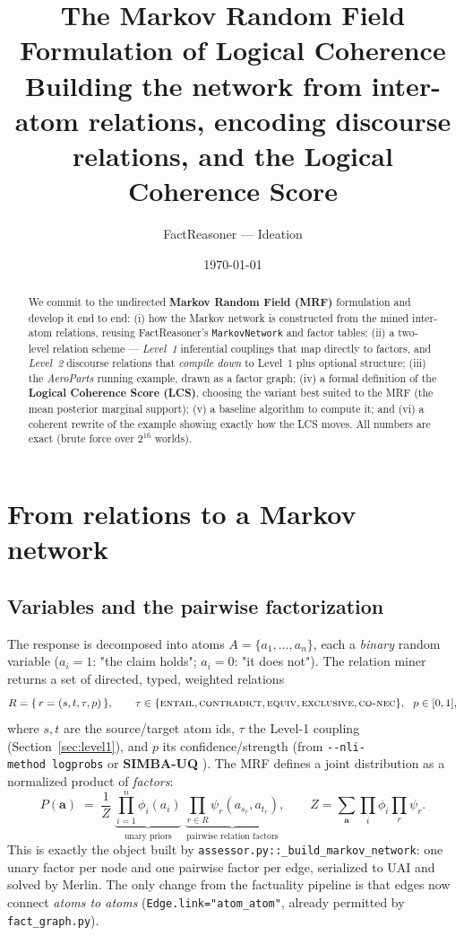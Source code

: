 \documentclass[11pt]{article}
\title{The Markov Random Field Formulation of Logical Coherence\\
       \large Building the network from inter-atom relations, encoding discourse
       relations, and the Logical Coherence Score}
\author{FactReasoner --- Ideation}
\date{\today}
\begin{document}
\maketitle

\begin{abstract}\noindent
We commit to the undirected \textbf{Markov Random Field (MRF)} formulation and develop it
end to end: (i) how the Markov network is constructed from the mined inter-atom relations,
reusing FactReasoner's \texttt{MarkovNetwork} and factor tables; (ii) a two-level relation
scheme --- \emph{Level~1} inferential couplings that map directly to factors, and
\emph{Level~2} discourse relations that \emph{compile down} to Level~1 plus optional
structure; (iii) the \emph{AeroParts} running example, drawn as a factor graph;
(iv) a formal definition of the \textbf{Logical Coherence Score (LCS)}, choosing the
variant best suited to the MRF (the mean posterior marginal support); (v) a baseline
algorithm to compute it; and (vi) a coherent rewrite of the example showing exactly how the
LCS moves. All numbers are exact (brute force over $2^{16}$ worlds).
\end{abstract}

\tableofcontents

\section{From relations to a Markov network}
\label{sec:build}

\subsection{Variables and the pairwise factorization}
The response is decomposed into atoms $A=\{a_1,\dots,a_n\}$, each a \emph{binary} random
variable ($a_i=1$: "the claim holds"; $a_i=0$: "it does not"). The relation miner returns a
set of directed, typed, weighted relations
\[
  R=\{\,r=(s,t,\tau,p)\,\},\qquad
  \tau\in\{\textsc{entail},\textsc{contradict},\textsc{equiv},\textsc{exclusive},\textsc{co-nec}\},\ \ p\in[0,1],
\]
where $s,t$ are the source/target atom ids, $\tau$ the Level-1 coupling
(Section~\ref{sec:level1}), and $p$ its confidence/strength (from
\texttt{-{}-nli-method\ logprobs} or \textbf{SIMBA-UQ} \citep{simbauq}). The MRF defines a
joint distribution as a normalized product of \emph{factors}:
\begin{equation}
  P(\mathbf a)\;=\;\frac{1}{Z}\;
  \underbrace{\prod_{i=1}^{n}\phi_i(a_i)}_{\text{unary priors}}\;
  \underbrace{\prod_{r\in R}\psi_r(a_{s_r},a_{t_r})}_{\text{pairwise relation factors}},
  \qquad
  Z=\sum_{\mathbf a}\prod_i\phi_i\prod_r\psi_r .
  \label{eq:joint}
\end{equation}
This is exactly the object built by
\texttt{assessor.py::\_build\_markov\_network}: one unary factor per node and one pairwise
factor per edge, serialized to UAI and solved by Merlin. The only change from the factuality
pipeline is that edges now connect \emph{atoms to atoms}
(\texttt{Edge.link="atom\_atom"}, already permitted by \texttt{fact\_graph.py}).
\end{document}
